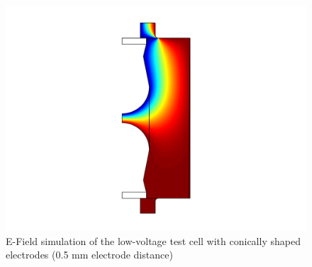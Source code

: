 \begin{figure}[htbp]
	\centering
	\includegraphics[scale=0.3]{figures/Method/Part1_d_C0/conic.png}		
	\caption[Kurze Abbildungsbeschreibung]{E-Field simulation of the low-voltage test cell with conically shaped electrodes (0.5 mm electrode distance)} \label{fig.comsol_conic}

\end{figure}

